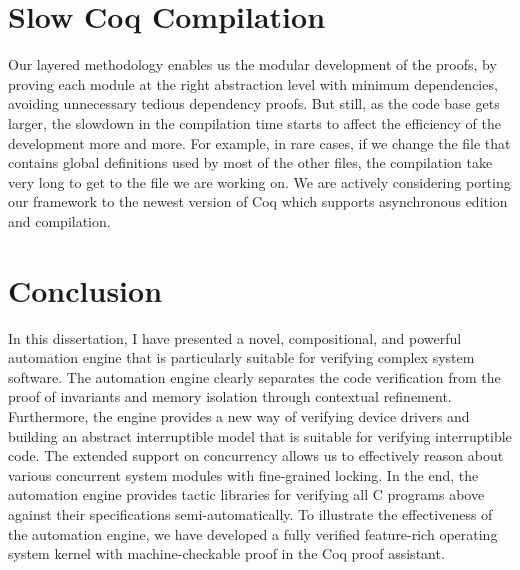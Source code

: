 \section{Slow Coq Compilation}
Our layered methodology enables us the modular development of the proofs, by proving
each module at the right abstraction level with minimum dependencies, avoiding unnecessary
tedious dependency proofs. But still, as the code base gets larger, the slowdown
in the compilation time starts to affect the efficiency of the development more and more.
For example, in rare cases, if we change the file that contains global definitions used by
most of the other files, the compilation take very long to get to the file we are working on.
We are actively considering porting our framework to the newest version of Coq which supports
asynchronous edition and compilation.

\section{Conclusion}
In this dissertation, I have presented a novel, compositional, and powerful
automation engine that is particularly suitable for verifying complex system software.
The automation engine clearly separates the code verification from the proof of invariants
and memory isolation through contextual refinement.
Furthermore, the engine provides a new way of verifying device drivers
and building an abstract interruptible model that is suitable for verifying
interruptible code. 
The extended support on concurrency allows us to effectively
reason about various concurrent system modules with fine-grained locking.
In the end, the automation engine provides tactic libraries for verifying
all C programs above against their specifications semi-automatically. 
To illustrate the effectiveness of the automation engine, we 
have developed a fully verified feature-rich operating system kernel 
with machine-checkable proof in the Coq proof assistant.

